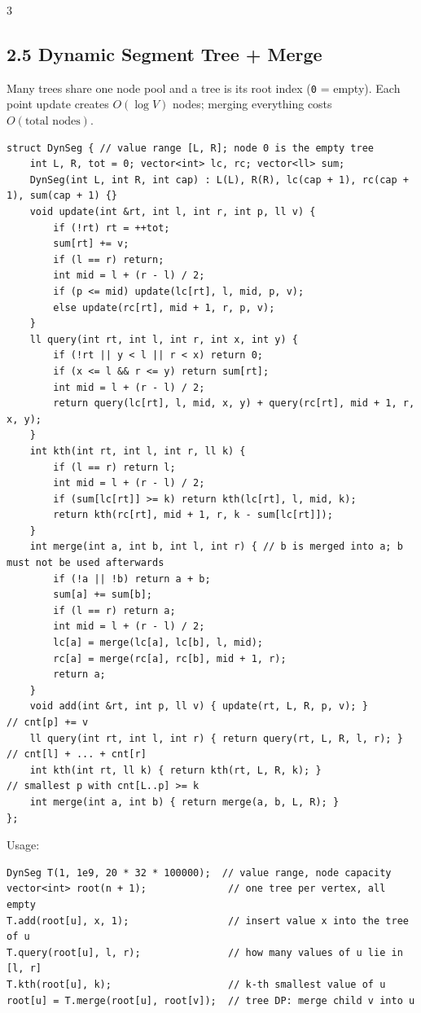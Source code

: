 \documentclass[8pt]{extarticle}
\begin{document}
\begin{multicols*}{3}
\subsection*{2.5 Dynamic Segment Tree + Merge}

Many trees share one node pool and a tree is its root index (\texttt{0} = empty). Each point update creates $O(\log V)$ nodes; merging everything costs $O(\text{total nodes})$.

\begin{lstlisting}
struct DynSeg { // value range [L, R]; node 0 is the empty tree
    int L, R, tot = 0; vector<int> lc, rc; vector<ll> sum;
    DynSeg(int L, int R, int cap) : L(L), R(R), lc(cap + 1), rc(cap + 1), sum(cap + 1) {}
    void update(int &rt, int l, int r, int p, ll v) {
        if (!rt) rt = ++tot;
        sum[rt] += v;
        if (l == r) return;
        int mid = l + (r - l) / 2;
        if (p <= mid) update(lc[rt], l, mid, p, v);
        else update(rc[rt], mid + 1, r, p, v);
    }
    ll query(int rt, int l, int r, int x, int y) {
        if (!rt || y < l || r < x) return 0;
        if (x <= l && r <= y) return sum[rt];
        int mid = l + (r - l) / 2;
        return query(lc[rt], l, mid, x, y) + query(rc[rt], mid + 1, r, x, y);
    }
    int kth(int rt, int l, int r, ll k) {
        if (l == r) return l;
        int mid = l + (r - l) / 2;
        if (sum[lc[rt]] >= k) return kth(lc[rt], l, mid, k);
        return kth(rc[rt], mid + 1, r, k - sum[lc[rt]]);
    }
    int merge(int a, int b, int l, int r) { // b is merged into a; b must not be used afterwards
        if (!a || !b) return a + b;
        sum[a] += sum[b];
        if (l == r) return a;
        int mid = l + (r - l) / 2;
        lc[a] = merge(lc[a], lc[b], l, mid);
        rc[a] = merge(rc[a], rc[b], mid + 1, r);
        return a;
    }
    void add(int &rt, int p, ll v) { update(rt, L, R, p, v); }           // cnt[p] += v
    ll query(int rt, int l, int r) { return query(rt, L, R, l, r); }    // cnt[l] + ... + cnt[r]
    int kth(int rt, ll k) { return kth(rt, L, R, k); }                  // smallest p with cnt[L..p] >= k
    int merge(int a, int b) { return merge(a, b, L, R); }
};
\end{lstlisting}

Usage:

\begin{lstlisting}
DynSeg T(1, 1e9, 20 * 32 * 100000);  // value range, node capacity
vector<int> root(n + 1);              // one tree per vertex, all empty
T.add(root[u], x, 1);                 // insert value x into the tree of u
T.query(root[u], l, r);               // how many values of u lie in [l, r]
T.kth(root[u], k);                    // k-th smallest value of u
root[u] = T.merge(root[u], root[v]);  // tree DP: merge child v into u
\end{lstlisting}


\end{multicols*}
\end{document}
